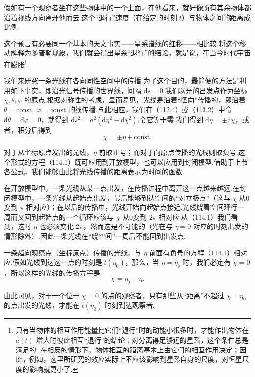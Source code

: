 假如有一个观察者坐在这些物体中的一个上面，在他看来，就好像所有其余物体都沿着视线方向离开他而去.这个“退行”速度（在给定的时刻 $t$）与物体之间的距离成比例.

这个预言有必要同一个基本的天文事实——星系谱线的红移——相比较.将这个移动解释为多普勒现象，我们就会得出星系“退行”的结论，就是说，在当今时代宇宙在膨胀\footnote{只有当物体的相互作用能量比它们“退行”时的动能小很多时，才能作出物体在 $a(t)$ 增大时彼此相互“退行”的结论；对分离得足够远的星系，这个条件总是满足的. 在相反的情形下，物体相互的距离基本上由它们的相互作用决定；因此，例如，这里所研究的效应实际上不应该影响到星系自身的尺度，对恒星尺度的影响就更小了.}.

我们来研究一条光线在各向同性空间中的传播.为了这个目的，最简便的方法是利用如下事实，即沿光信号传播的世界线，间隔 $\mathrm{d}s=0$.我们以光的出发点作为坐标 $\chi,\theta,\varphi$ 的原点.根据对称性的考虑，显而易见，光线是沿着“径向”传播的，即沿着 $\theta=\mathrm{const},\ \varphi=\mathrm{const}$ 的线传播.与此相应，我们在（112.4）或（113.2）中令 $\mathrm{d}\theta=\mathrm{d}\varphi=0$，就得到 $\mathrm{d}s^{2}=a^{2}(\mathrm{d}\eta^{2}-\mathrm{d}\chi^{2})$.令它等于零.我们得到 $\mathrm{d}\eta=\pm\mathrm{d}\chi$，或者，积分后得到
\begin{equation}
  \chi=\pm\eta+\mathrm{const}.
\end{equation}

对于从坐标原点发出的光线，$\eta$ 前取正号；而对于向原点传播的光线则取负号.这个形式的方程（114.1）既可应用到开放模型，也可以应用到封闭模型.借助于上节各公式，我们能够由此将光线传播的距离表示为时间的函数.

在开放模型中，一条光线从某一点出发，在传播过程中离开这一点越来越远.在封闭模型中，一条光线从起始点出发，最后能够到达空间的“对立极点”（这与 $\chi$ 从0变到 $\pi$ 相对应）；在以后的传播中，光线开始向起始点接近.光线绕着空间环行一周而又回到起始点的一个循环应该与 $\chi$ 从0变到 $2\pi$ 相对应.从（114.1）我们看到，这时 $\eta$ 也必须变化 $2\pi$，然而这是不可能的（光在与 $\eta=0$ 对应的时刻出发的情形除外）.因此一条光线在“绕空间”一周后不能回到出发点.

一条趋向观察点（坐标原点）传播的光线，与 $\eta$ 前面有负号的方程（114.1）相对应.假如光线到达这一点的时刻是 $t(\eta_{0})$，那么，当 $\eta=\eta_{0}$ 时，我们必定有 $\chi=0$，所以这样的光线的传播方程是
\begin{equation}
  \chi=\eta_{0}-\eta.
\end{equation}

由此可见，对于一个位于 $\chi=0$ 的点的观察者，只有那些从“距离”不超过 $\chi=\eta_{0}$ 的点出发的光线，才能在 $t(\eta_{0})$ 时刻到达观察者.

